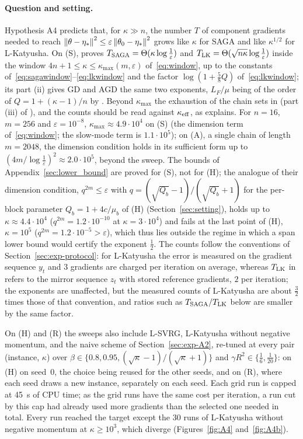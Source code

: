 \paragraph{Question and setting.}
Hypothesis A4 predicts that, for $\kappa\gg n$, the number $T$ of component gradients needed to reach
$\left\|\theta-\eta_\ast\right\|^2\le\varepsilon\left\|\theta_0-\eta_\ast\right\|^2$ grows like $\kappa$ for SAGA and like $\kappa^{1/2}$ for
L-Katyusha. On (S),  proves $T_{\rm SAGA}=\Theta(\kappa\log\frac1\varepsilon)$ and
$T_{\rm LK}=\Theta(\sqrt{n\kappa}\log\frac1\varepsilon)$ inside the window $4n+1\le\kappa\le\kappa_{\max}(m,\varepsilon)$
of~\eqref{eq:window}, up to the constants of~\eqref{eq:sagawindow}--\eqref{eq:lkwindow} and the factor
$\log(1+\frac58Q)$ of~\eqref{eq:lkwindow}; its part (ii) gives GD and AGD the same two exponents, $L_F/\mu$ being of the
order of $Q=1+(\kappa-1)/n$ by . Beyond $\kappa_{\max}$ the exhaustion of the chain sets in (part
(iii) of ), and the counts should be read against $\kappa_{\rm eff}$, as  explains. For $n=16$,
$m=256$ and $\varepsilon=10^{-8}$, $\kappa_{\max}\approx4.9\cdot10^4$ on (S) (the dimension term of~\eqref{eq:window}; the
slow-mode term is $1.1\cdot10^5$); on (A), a single chain of length $m=2048$, the dimension condition holds in its
sufficient form up to $(4m/\log\frac1\varepsilon)^2\approx2.0\cdot10^5$, beyond the sweep. The bounds of
Appendix~\ref{sec:lower_bound} are proved for (S), not for (H); the analogue of their dimension condition,
$q^{2m}\le\varepsilon$ with $q=(\sqrt{Q_b}-1)/(\sqrt{Q_b}+1)$ for the per-block parameter $Q_b=1+4c/\mu_b$ of (H)
(Section~\ref{sec:setting}), holds up to $\kappa\approx4.4\cdot10^4$ ($q^{2m}=1.2\cdot10^{-10}$ at $\kappa=3\cdot10^4$) and
fails at the last point of (H), $\kappa=10^5$ ($q^{2m}=1.2\cdot10^{-5}>\varepsilon$), which thus lies outside the regime in
which a span lower bound would certify the exponent $\frac12$. The counts follow the conventions of
Section~\ref{sec:exp-protocol}: for L-Katyusha the error is measured on the gradient sequence $y_t$ and $3$ gradients
are charged per iteration on average, whereas $T_{\rm LK}$ in  refers to the mirror sequence $z_t$ with
stored reference gradients, $2$ per iteration; the exponents are unaffected, but the measured counts of L-Katyusha are
about $\frac32$ times those of that convention, and ratios such as $T_{\rm SAGA}/T_{\rm LK}$ below are smaller by the same
factor.

On (H) and (R) the sweeps also include L-SVRG, L-Katyusha without negative momentum, and the naive scheme of
Section~\ref{sec:exp-A2}, re-tuned at every pair (instance, $\kappa$) over $\beta\in\{0.8,0.95,(\sqrt\kappa-1)/(\sqrt\kappa+1)\}$
and $\gamma R^2\in\{\frac16,\frac1{20}\}$: on (H) on seed~$0$, the choice being reused for the other seeds, and on (R),
where each seed draws a new instance, separately on each seed. Each grid run is capped at 45~s of CPU time; as the grid
runs have the same cost per iteration, a run cut by this cap had already used more gradients than the selected one
needed in total. Every run reached the target except the 30 runs of L-Katyusha without negative momentum at
$\kappa\ge10^3$, which diverge (Figures~\ref{fig:A4} and~\ref{fig:A4b}).

